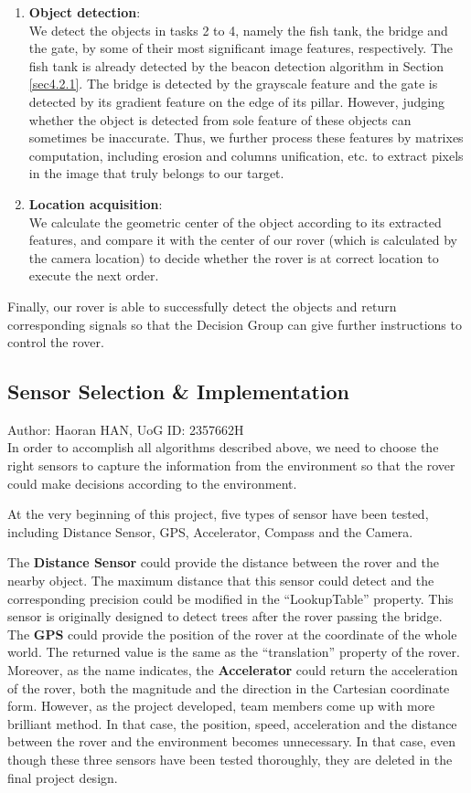 \begin{enumerate}
    \item \textbf{Object detection}:\\ 
    We detect the objects in tasks 2 to 4, namely the fish tank, the bridge and the gate, by some of their most significant image features, respectively. The fish tank is already detected by the beacon detection algorithm in Section \ref{sec4.2.1}. The bridge is detected by the grayscale feature and the gate is detected by its gradient feature on the edge of its pillar. However, judging whether the object is detected from sole feature of these objects can sometimes be inaccurate. Thus, we further process these features by matrixes computation, including erosion and columns unification, etc. to extract pixels in the image that truly belongs to our target. 
    \item \textbf{Location acquisition}:\\
    We calculate the geometric center of the object according to its extracted features, and compare it with the center of our rover (which is calculated by the camera location) to decide whether the rover is at correct location to execute the next order.
\end{enumerate}

Finally, our rover is able to successfully detect the objects and return corresponding signals so that the Decision Group can give further instructions to control the rover.
\subsection{Sensor Selection \& Implementation}
Author: Haoran HAN, UoG ID: 2357662H\\

In order to accomplish all algorithms described above, we need to choose the right sensors to capture the information from the environment so that the rover could make decisions according to the environment.

At the very beginning of this project, five types of sensor have been tested, including Distance Sensor, GPS, Accelerator, Compass and the Camera. 

The \textbf{Distance Sensor} could provide the distance between the rover and the nearby object. The maximum distance that this sensor could detect and the corresponding precision could be modified in the “LookupTable” property. This sensor is originally designed to detect trees after the rover passing the bridge. The \textbf{GPS} could provide the position of the rover at the coordinate of the whole world. The returned value is the same as the “translation” property of the rover. Moreover, as the name indicates, the \textbf{Accelerator} could return the acceleration of the rover, both the magnitude and the direction in the Cartesian coordinate form. However, as the project developed, team members come up with more brilliant method. In that case, the position, speed, acceleration and the distance between the rover and the environment becomes unnecessary. In that case, even though these three sensors have been tested thoroughly, they are deleted in the final project design.


